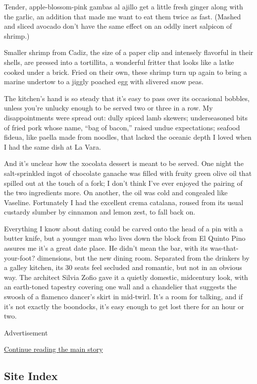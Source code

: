 Tender, apple-blossom-pink gambas al ajillo get a little fresh ginger
along with the garlic, an addition that made me want to eat them twice
as fast. (Mashed and sliced avocado don't have the same effect on an
oddly inert salpicon of shrimp.)

Smaller shrimp from Cadiz, the size of a paper clip and intensely
flavorful in their shells, are pressed into a tortillita, a wonderful
fritter that looks like a latke cooked under a brick. Fried on their
own, these shrimp turn up again to bring a marine undertow to a jiggly
poached egg with slivered snow peas.

The kitchen's hand is so steady that it's easy to pass over its
occasional bobbles, unless you're unlucky enough to be served two or
three in a row. My disappointments were spread out: dully spiced lamb
skewers; underseasoned bits of fried pork whose name, ``bag of bacon,''
raised undue expectations; seafood fideua, like paella made from
noodles, that lacked the oceanic depth I loved when I had the same dish
at La Vara.

And it's unclear how the xocolata dessert is meant to be served. One
night the salt-sprinkled ingot of chocolate ganache was filled with
fruity green olive oil that spilled out at the touch of a fork; I don't
think I've ever enjoyed the pairing of the two ingredients more. On
another, the oil was cold and congealed like Vaseline. Fortunately I had
the excellent crema catalana, roused from its usual custardy slumber by
cinnamon and lemon zest, to fall back on.

Everything I know about dating could be carved onto the head of a pin
with a butter knife, but a younger man who lives down the block from El
Quinto Pino assures me it's a great date place. He didn't mean the bar,
with its was-that-your-foot? dimensions, but the new dining room.
Separated from the drinkers by a galley kitchen, its 30 seats feel
secluded and romantic, but not in an obvious way. The architect Silvia
Zofio gave it a quietly domestic, midcentury look, with an earth-toned
tapestry covering one wall and a chandelier that suggests the swoosh of
a flamenco dancer's skirt in mid-twirl. It's a room for talking, and if
it's not exactly the boondocks, it's easy enough to get lost there for
an hour or two.

Advertisement

\protect\hyperlink{after-bottom}{Continue reading the main story}

\hypertarget{site-index}{%
\subsection{Site Index}\label{site-index}}

